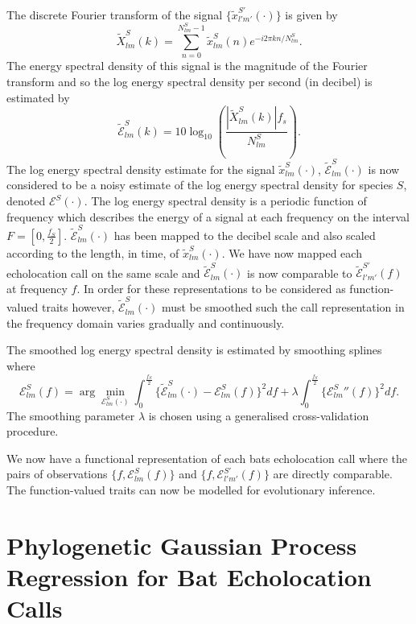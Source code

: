 \documentclass[wsdraft]{ws-rv9x6} %
\begin{document}
The discrete Fourier transform of the signal \(\{\tilde{x}_{l'm'}^{S'}(\cdot)\}\) is given by\[\tilde{X}_{lm}^S(k) = \sum_{n = 0}^{N_{lm}^S - 1} \tilde{x}_{lm}^{S}(n) e^{-i2\pi kn / N_{lm}^S }.\] 
The energy spectral density of this signal is the magnitude of the Fourier transform and so the log energy spectral density per second (in decibel) is estimated by \[\tilde{\mathcal{E}}_{lm}^S(k) = 10 \log_{10} \left( \frac{|\tilde{X}_{lm}^S(k)|f_s}{N_{lm}^S}\right).\]
The log energy spectral density estimate for the signal \(\tilde{x}_{lm}^S(\cdot)\), \(\tilde{\mathcal{E}}_{lm}^S(\cdot)\) is now considered to be a noisy estimate of the log energy spectral density for species \(S\), denoted \(\mathcal{E}^S(\cdot)\). The log energy spectral density is a periodic function of frequency which describes the energy of a signal at each frequency on the interval \(F = [0, \frac{f_S}{2}]\). \(\tilde{\mathcal{E}}_{lm}^S(\cdot)\) has been mapped to the decibel scale and also scaled according to the length, in time, of \(\tilde{x}_{lm}^S(\cdot)\).\cite{antoniou2006digital} We have now mapped each echolocation call on the same scale and \(\tilde{\mathcal{E}}_{lm}^S(\cdot)\) is now comparable to \(\tilde{\mathcal{E}}_{l'm'}^{S'}(f)\) at frequency \(f\). In order for these representations to be considered as function-valued traits however, \(\tilde{\mathcal{E}}_{lm}^S(\cdot)\) must be smoothed such the call representation in the frequency domain varies gradually and continuously.

The smoothed log energy spectral density is estimated by smoothing splines where \[
\mathcal{E}_{lm}^S(f) = \arg \min_{\mathcal{E}_{lm}^S(\cdot)} \int_{0}^{\frac{f_S}{2}}  \{ \tilde{\mathcal{E}}_{lm}^S(\cdot) - \mathcal{E}_{lm}^S(f) \}^2 df + \lambda \int_{0}^{\frac{f_S}{2}} \{ {\mathcal{E}_{lm}^{S}}'' (f)\}^2 df.
\]
The smoothing parameter \(\lambda\) is chosen using a generalised cross-validation procedure.\cite{friedman2001elements} \cite{citeR}

We now have a functional representation of each bats echolocation call where the pairs of observations \(\{f, \mathcal{E}_{lm}^S(f)\}\) and \(\{f, \mathcal{E}_{l'm'}^{S'}(f)\}\) are directly comparable. The function-valued traits can now be modelled for evolutionary inference.

\section{Phylogenetic Gaussian Process Regression for Bat Echolocation Calls} 
\end{document}
